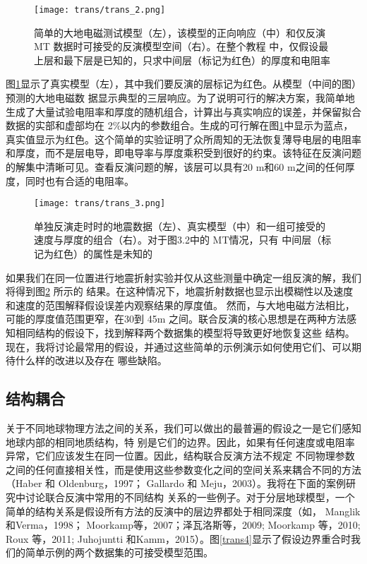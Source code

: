 \begin{figure}
    \centering
    \texttt{[image: trans/trans\_2.png]}
    \caption[]{简单的大地电磁测试模型（左），该模型的正向响应（中）和仅反演 MT 数据时可接受的反演模型空间（右）。在整个教程 中，仅假设最上层和最下层是已知的，只求中间层（标记为红色）的厚度和电阻率} \label{trans2}
\end{figure}

图\ref{trans2}显示了真实模型（左），其中我们要反演的层标记为红色。从模型（中间的图）预测的大地电磁数 据显示典型的三层响应。为了说明可行的解决方案，我简单地生成了大量试验电阻率和厚度的随机组合，计算出与真实响应的误差，并保留拟合数据的实部和虚部均在 2\%以内的参数组合。生成的可行解在图\ref{trans2}中显示为蓝点，真实值显示为红色。这个简单的实验证明了众所周知的无法恢复薄导电层的电阻率和厚度，而不是层电导，即电导率与厚度乘积受到很好的约束。该特征在反演问题的解集中清晰可见。查看反演问题的解，该层可以具有20 m和60 m之间的任何厚度，同时也有合适的电阻率。

\begin{figure}[H]
    \centering
    \texttt{[image: trans/trans\_3.png]}
    \caption[]{单独反演走时时的地震数据（左）、真实模型（中）和一组可接受的速度与厚度的组合（右）。对于图3.2中的 MT情况，只有 中间层（标记为红色）的属性是未知的} \label{trans3}
\end{figure}

如果我们在同一位置进行地震折射实验并仅从这些测量中确定一组反演的解，我们将得到图\ref{trans3} 所示的 结果。在这种情况下，地震折射数据也显示出模糊性以及速度和速度的范围解释假设误差内观察结果的厚度值。 然而，与大地电磁方法相比，可能的厚度值范围更窄，在30到 45m 之间。联合反演的核心思想是在两种方法感知相同结构的假设下，找到解释两个数据集的模型将导致更好地恢复这些 结构。现在，我将讨论最常用的假设，并通过这些简单的示例演示如何使用它们、可以期待什么样的改进以及存在 哪些缺陷。


\subsection{结构耦合}

关于不同地球物理方法之间的关系，我们可以做出的最普遍的假设之一是它们感知地球内部的相同地质结构，特 别是它们的边界。因此，如果有任何速度或电阻率异常，它们应该发生在同一位置。因此，结构联合反演方法不规定 不同物理参数之间的任何直接相关性，而是使用这些参数变化之间的空间关系来耦合不同的方法（Haber 和 Oldenburg，1997； Gallardo 和 Meju，2003）。我将在下面的案例研究中讨论联合反演中常用的不同结构 关系的一些例子。对于分层地球模型，一个简单的结构关系是假设所有方法的反演中的层边界都处于相同深度（如， Manglik 和Verma，1998； Moorkamp等，2007；泽瓦洛斯等，2009; Moorkamp 等，2010; Roux 等，2011; Juhojuntti 和Kamm，2015）。图\ref{trans4}显示了假设边界重合时我们的简单示例的两个数据集的可接受模型范围。

